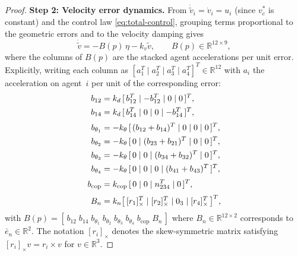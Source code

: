 \begin{proof}
\medskip\noindent\textbf{Step 2: Velocity error dynamics.}\quad
From \(\dot{\tilde v}_i=\dot v_i=u_i\) (since \(v_c^*\) is constant) and the control law \eqref{eq:total-control}, grouping terms proportional to the geometric errors and to the velocity damping gives
\begin{equation}
\boxed{\dot{\tilde v} = -B(p)\,\eta - k_v\tilde v},\qquad
B(p)\in\mathbb R^{12\times 9},
\label{eq:v-dot}
\end{equation}
where the columns of \(B(p)\) are the stacked agent accelerations per unit error. Explicitly, writing each column as \([a_1^{T}\mid a_2^{T}\mid a_3^{T}\mid a_4^{T}]^{T}\in\mathbb R^{12}\) with \(a_i\) the acceleration on agent~\(i\) per unit of the corresponding error:
\begin{align}
b_{12}&=k_d\,[\,b_{12}^{T}\mid-b_{12}^{T}\mid0\mid0\,]^{T},\notag\\
b_{14}&=k_d\,[\,b_{14}^{T}\mid0\mid0\mid-b_{14}^{T}\,]^{T},\notag\\[2pt]
b_{\theta_1}&=-k_\theta\,[\,(b_{12}+b_{14})^{T}\mid0\mid0\mid0\,]^{T},\notag\\
b_{\theta_2}&=-k_\theta\,[\,0\mid(b_{23}+b_{21})^{T}\mid0\mid0\,]^{T},\notag\\
b_{\theta_3}&=-k_\theta\,[\,0\mid0\mid(b_{34}+b_{32})^{T}\mid0\,]^{T},\notag\\
b_{\theta_4}&=-k_\theta\,[\,0\mid0\mid0\mid(b_{41}+b_{43})^{T}\,]^{T},\notag\\[2pt]
b_{\mathrm{cop}}&=k_{\mathrm{cop}}\,[\,0\mid0\mid n_{234}^{T}\mid0\,]^{T},\notag\\[2pt]
B_n&=k_n\bigl[\,[r_1]_{\times}^{T}\mid[r_2]_{\times}^{T}\mid0_{3}\mid[r_4]_{\times}^{T}\,\bigr]^{T},\notag
\end{align}
with \(B(p)=[\,b_{12}\;b_{14}\;b_{\theta_1}\;b_{\theta_2}\;b_{\theta_3}\;b_{\theta_4}\;b_{\mathrm{cop}}\;B_n\,]\) where \(B_n\in\mathbb R^{12\times 2}\) corresponds to \(\bar e_n\in\mathbb R^2\). The notation \([r_i]_{\times}\) denotes the skew-symmetric matrix satisfying \([r_i]_{\times}v=r_i\times v\) for \(v\in\mathbb R^{3}\).


\end{proof}
